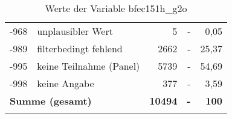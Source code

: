 \begin{longtable}{Xlrrr}
       -968 & unplausibler Wert & 5 & - & 0,05 \\

       -989 & filterbedingt fehlend & 2662 & - & 25,37 \\

       -995 & keine Teilnahme (Panel) & 5739 & - & 54,69 \\

       -998 & keine Angabe & 377 & - & 3,59 \\

     \midrule
     \multicolumn{2}{l}{\textbf{Summe (gesamt)}} & \textbf{10494} & \textbf{-} & \textbf{100} \\
     \bottomrule
     \caption{Werte der Variable bfec151h\_g2o}
     \end{longtable}
     
